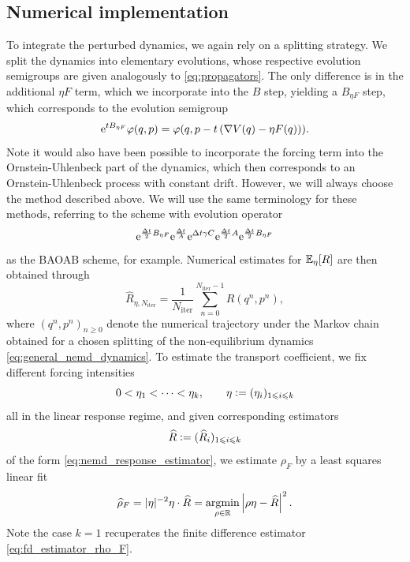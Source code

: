 \subsection{Numerical implementation}
To integrate the perturbed dynamics, we again rely on a splitting strategy.
We split the dynamics into elementary evolutions, whose respective evolution semigroups are given analogously to \eqref{eq:propagators}.
The only difference is in the additional $\eta F$ term, which we incorporate into the $B$ step, yielding a $B_{\eta F}$ step, which corresponds to the evolution semigroup
\begin{equation}
    \label{eq:B_etaF_step}
    \mathrm{e}^{tB_{\eta F}}\varphi(q,p)=\varphi(q,p-t\left(\nabla V(q)-\eta F(q)\right)).
\end{equation}
Note it would also have been possible to incorporate the forcing term into the Ornstein-Uhlenbeck part of the dynamics, which then corresponds to an Ornstein-Uhlenbeck process with constant drift.
However, we will always choose the method described above. We will use the same terminology for these methods, referring to the scheme with evolution operator
\begin{equation}
    \mathrm{e}^{\frac{{\Delta t}}2B_{\eta F}}\mathrm{e}^{\frac{{\Delta t}}A}\mathrm{e}^{{\Delta t}\gamma C}\mathrm{e}^{\frac{{\Delta t}}2A}\mathrm{e}^{\frac{{\Delta t}}2B_{\eta F}}
\end{equation}
as the BAOAB scheme, for example.
Numerical estimates for $\mathbb{E}_\eta[R]$ are then obtained through 
\begin{equation}
    \label{eq:nemd_response_estimator}
    \widehat{R}_{\eta,N_{\mathrm{iter}}}= \frac{1}{N_{\mathrm{iter}}}\sum_{n=0}^{N_\mathrm{iter}-1} R(q^n,p^n),
\end{equation}
where $(q^n,p^n)_{n\geq 0}$ denote the numerical trajectory under the Markov chain obtained for a chosen splitting of the non-equilibrium dynamics \eqref{eq:general_nemd_dynamics}.
To estimate the transport coefficient, we fix different forcing intensities
\[0<\eta_1<\dotsm<\eta_k,\qquad \eta\mathrel{\mathop:}= (\eta_i)_{1\leqslant i\leqslant k}\]
all in the linear response regime, and given corresponding estimators 
\[\widehat{R} \mathrel{\mathop:}= (\widehat{R}_i)_{1\leqslant i\leqslant k}\]
of the form \eqref{eq:nemd_response_estimator}, we estimate $\rho_F$ by a least squares linear fit 
\begin{equation}
    \label{eq:rho_F_nemd_estimator}
    \widehat{\rho}_F= |\eta|^{-2}\eta\cdot\widehat{R}= \underset{\rho \in \mathbb{R}}{\mathrm{argmin}} \left| \rho\eta - \widehat{R}\right|^2.
\end{equation}
Note the case $k=1$ recuperates the finite difference estimator \eqref{eq:fd_estimator_rho_F}. 
